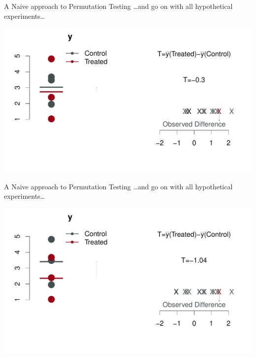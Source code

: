 \begin{frame}{A Naive approach to Permutation Testing}
 \ldots and go on with all hypothetical experiments\ldots 
\begin{center}
\includegraphics[width=1.1\textwidth]{figures/permsslides12} 
\end{center}
\end{frame}


\begin{frame}{A Naive approach to Permutation Testing}
 \ldots and go on with all hypothetical experiments\ldots 
\begin{center}
\includegraphics[width=1.1\textwidth]{figures/permsslides13} 
\end{center}
\end{frame}


